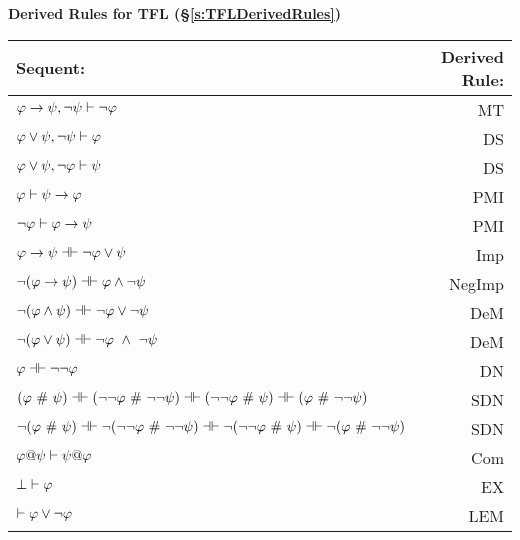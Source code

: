 \vspace{1em}
\begin{center}
\textbf{\Large Derived Rules for TFL (\S \ref{s:TFLDerivedRules})}
\end{center}


\begin{center}
\begin{tabular}{l  r}
\textbf{Sequent:}                    &       \textbf{Derived Rule:} \\ \hline
$\mathcal{\varphi} \rightarrow \mathcal{\psi},  \neg\mathcal{\psi} \vdash \neg \mathcal{\varphi}$   &                       MT  \\
$\mathcal{\varphi} \vee \mathcal{\psi},  \neg\mathcal{\psi} \vdash \mathcal{\varphi}$ & DS\\
$\mathcal{\varphi} \vee \mathcal{\psi},  \neg\mathcal{\varphi}\vdash \mathcal{\psi}$    &      DS  \\
$\mathcal{\varphi} \vdash\mathcal{\psi} \rightarrow \mathcal{\varphi}$  &              PMI  \\
$\neg\mathcal{\varphi}\vdash\mathcal{\varphi}\rightarrow \mathcal{\psi}$  & PMI\\
$\meta{\varphi} \rightarrow\meta{\psi} \pequiv \enot\meta{\varphi}\eor \meta{\psi}$  &                   Imp   \\
$\enot (\meta{\varphi} \rightarrow \meta{\psi}) \pequiv \meta{\varphi} \eand \enot \meta{\psi}$  &               NegImp  \\
$\enot (\meta{\varphi} \eand \meta{\psi})  \pequiv \enot\meta{\varphi}\eor \enot \meta{\psi}$  &                DeM  \\
$\enot (\meta{\varphi} \eor \meta{\psi}) \pequiv \enot\meta{\varphi}\ \eand \ \enot \meta{\psi}$   &               DeM  \\
$\meta{\varphi} \pequiv \enot \enot \meta{\varphi}$     &                              DN  \\
$(\meta{\varphi}  \ \#\  \meta{\psi}) \pequiv (\enot \enot \meta{\varphi}  \ \#\   \enot \enot \meta{\psi}) \pequiv (\enot \enot \meta{\varphi}  \ \#\  \meta{\psi}) \pequiv (\meta{\varphi}  \ \#\  \enot \enot  \meta{\psi})$ & SDN\\
$\enot (\meta{\varphi}  \ \#\  \meta{\psi}) \pequiv \enot (\enot \enot \meta{\varphi}  \ \#\   \enot \enot \meta{\psi}) \pequiv \enot (\enot \enot \meta{\varphi}  \ \#\  \meta{\psi}) \pequiv \enot (\meta{\varphi}  \ \#\  \enot \enot  \meta{\psi})$ & SDN\\
$\mathcal{\varphi} @ \mathcal{\psi}  \vdash  \mathcal{\psi} @ \mathcal{\varphi}$ &                          Com \\
$\bot \vdash \mathcal{\varphi}$ & EX \\
 $\vdash \mathcal{\varphi}\vee \neg \mathcal{\varphi}$ &                                                    LEM \\
\end{tabular}
\end{center}


